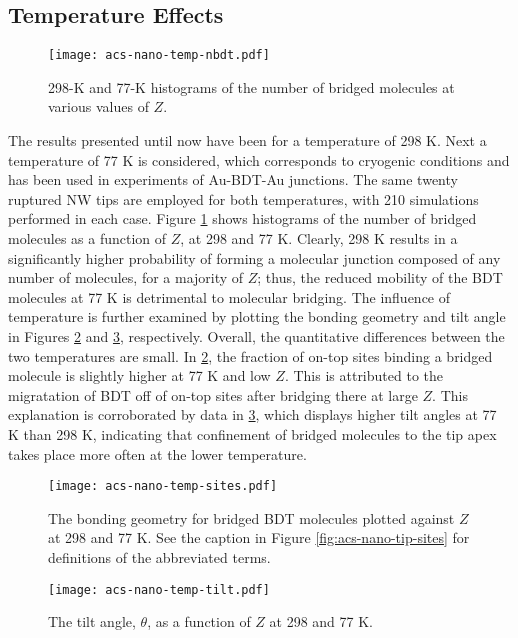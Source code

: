 \documentclass[10pt]{report}  %
\newcommand\findent{\hspace*{\parindent}}
\begin{document}
\subsection{Temperature Effects}

\begin{figure}[b!]
	\centering
	\texttt{[image: acs-nano-temp-nbdt.pdf]}
	\caption{298-K and 77-K histograms of the number of bridged molecules at various values of $Z$.}
	\label{fig:acs-nano-temp-nbdt}
\end{figure}

\findent The results presented until now have been for a temperature of 298 K.  Next a temperature of 77 K is considered, which corresponds to cryogenic conditions and has been used in experiments of Au-BDT-Au junctions. \cite{Tsutsui:2009}  The same twenty ruptured NW tips are employed for both temperatures, with 210 simulations performed in each case.   Figure \ref{fig:acs-nano-temp-nbdt} shows histograms of the number of bridged molecules as a function of $Z$, at 298 and 77 K.  Clearly, 298 K results in a significantly higher probability of forming a molecular junction composed of any number of molecules, for a majority of $Z$; thus, the reduced mobility of the BDT molecules at 77 K is detrimental to molecular bridging. The influence of temperature is further examined by plotting the bonding geometry and tilt angle in Figures \ref{fig:acs-nano-temp-sites} and \ref{fig:acs-nano-temp-tilt}, respectively.  Overall, the quantitative differences between the two temperatures are small.  In \ref{fig:acs-nano-temp-sites}, the fraction of on-top sites binding a bridged molecule is slightly higher at 77 K and low $Z$.  This is attributed to the migratation of BDT off of on-top sites after bridging there at large $Z$.  This explanation is corroborated by data in \ref{fig:acs-nano-temp-tilt}, which displays higher tilt angles at 77 K than 298 K, indicating that confinement of bridged molecules to the tip apex takes place more often at the lower temperature.

\begin{figure}[t!]
	\centering
	\texttt{[image: acs-nano-temp-sites.pdf]}
	\caption{ The bonding geometry for bridged BDT molecules plotted against $Z$ at 298 and 77 K.  See the caption in Figure \ref{fig:acs-nano-tip-sites} for definitions of the abbreviated terms.}
	\label{fig:acs-nano-temp-sites}
\end{figure}

\begin{figure}[h!]
	\centering
	\texttt{[image: acs-nano-temp-tilt.pdf]}
	\caption{The tilt angle, $\theta$, as a function of $Z$ at 298 and 77 K. }
	\label{fig:acs-nano-temp-tilt}
\end{figure}
\end{document}
